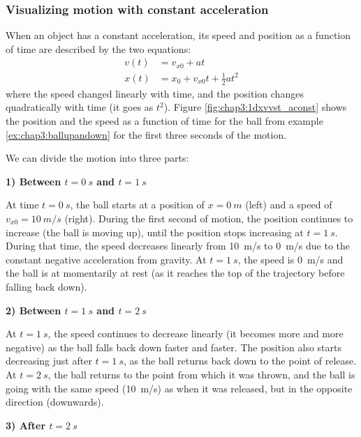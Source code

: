 \subsubsection{Visualizing motion with constant acceleration}

When an object has a constant acceleration, its speed and position as a function of time are described by the two equations:
\begin{align*}
v(t) &= v_{x0} + at\\
x(t) &= x_0+v_{x0}t+ \frac{1}{2}at^2
\end{align*}
where the speed changed linearly with time, and the position changes quadratically with time (it goes as $t^2$). Figure \ref{fig:chap3:1dxvvst_aconst} shows the position and the speed as a function of time for the ball from example \ref{ex:chap3:ballupandown} for the first three seconds of the motion.


We can divide the motion into three parts:

\textbf{1) Between $t=\SI{0}{s}$ and $t=\SI{1}{s}$}

At time $t=\SI{0}{s}$, the ball starts at a position of $x=\SI{0}{m}$ (left) and a speed of $v_{x0}=\SI{10}{m/s}$ (right). During the first second of motion, the position continues to increase (the ball is moving up), until the position stops increasing at $t=\SI{1}{s}$. During that time, the speed decreases linearly from \SI{10}{m/s} to \SI{0}{m/s} due to the constant negative acceleration from gravity. At $t=\SI{1}{s}$, the speed is \SI{0}{m/s} and the ball is at momentarily at rest (as it reaches the top of the trajectory before falling back down).

\textbf{2) Between $t=\SI{1}{s}$ and $t=\SI{2}{s}$}

At $t=\SI{1}{s}$, the speed continues to decrease linearly (it becomes more and more negative) as the ball falls back down faster and faster. The position also starts decreasing just after $t=\SI{1}{s}$, as the ball returns back down to the point of release. At $t=\SI{2}{s}$, the ball returns to the point from which it was thrown, and the ball is going with the same speed (\SI{10}{m/s}) as when it was released, but in the opposite direction (downwards).

\textbf{3) After $t=\SI{2}{s}$}

